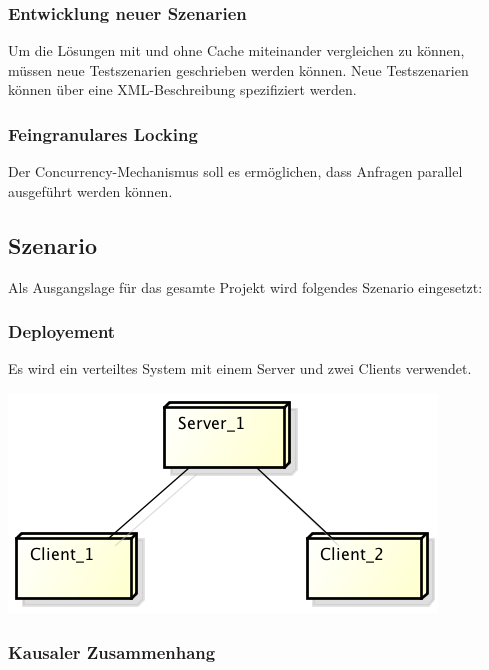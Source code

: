 \documentclass{article}
\begin{document}
\subsubsection{Entwicklung neuer Szenarien}
\label{sec:entwicklung-neuer-szenarien}

Um die Lösungen mit und ohne Cache miteinander vergleichen zu können,
müssen neue Testszenarien geschrieben werden können. Neue
Testszenarien können über eine XML-Beschreibung spezifiziert werden.

\subsubsection{Feingranulares Locking}
\label{sec:feingr-lock}

Der Concurrency-Mechanismus soll es ermöglichen, dass Anfragen parallel ausgeführt werden können.

\subsection{Szenario}
\label{sec:szenario}

Als Ausgangslage für das gesamte Projekt wird folgendes Szenario eingesetzt:

\subsubsection{Deployement}
\label{sec:deployement}

Es wird ein verteiltes System mit einem Server und zwei Clients verwendet.
\begin{center}
\includegraphics[scale=0.85]{Deployment.png}
\end{center}

\subsubsection{Kausaler Zusammenhang}
\label{sec:kaus-zusamm}
\end{document}
